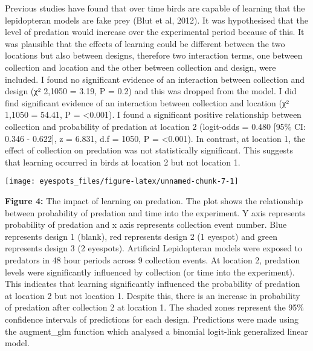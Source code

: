 \documentclass[
]{article}
\begin{document}
Previous studies have found that over time birds are capable of learning
that the lepidopteran models are fake prey (Blut et al, 2012). It was
hypothesised that the level of predation would increase over the
experimental period because of this. It was plausible that the effects
of learning could be different between the two locations but also
between designs, therefore two interaction terms, one between collection
and location and the other between collection and design, were included.
I found no significant evidence of an interaction between collection and
design (χ² 2,1050 = 3.19, P = 0.2) and this was dropped from the model.
I did find significant evidence of an interaction between collection and
location (χ² 1,1050 = 54.41, P = \textless0.001). I found a significant
positive relationship between collection and probability of predation at
location 2 (logit-odds = 0.480 {[}95\% CI: 0.346 - 0.622{]}, z = 6.831,
d.f = 1050, P = \textless0.001). In contrast, at location 1, the effect
of collection on predation was not statistically significant. This
suggests that learning occurred in birds at location 2 but not location
1.

\begin{center}\texttt{[image: eyespots\_files/figure-latex/unnamed-chunk-7-1]} \end{center}

\textbf{Figure 4:} The impact of learning on predation. The plot shows
the relationship between probability of predation and time into the
experiment. Y axis represents probability of predation and x axis
represents collection event number. Blue represents design 1 (blank),
red represents design 2 (1 eyespot) and green represents design 3 (2
eyespots). Artificial Lepidopteran models were exposed to predators in
48 hour periods across 9 collection events. At location 2, predation
levels were significantly influenced by collection (or time into the
experiment). This indicates that learning significantly influenced the
probability of predation at location 2 but not location 1. Despite this,
there is an increase in probability of predation after collection 2 at
location 1. The shaded zones represent the 95\% confidence intervals of
predictions for each design. Predictions were made using the
augment\_glm function which analysed a binomial logit-link generalized
linear model.
\end{document}
